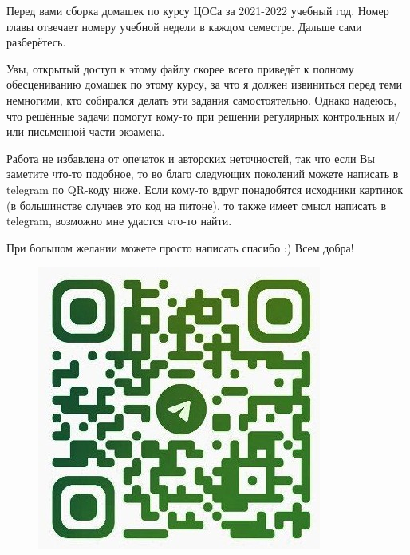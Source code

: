 Перед вами сборка домашек по курсу ЦОСа за 2021-2022 учебный год. Номер главы отвечает номеру учебной недели в каждом семестре. Дальше сами разберётесь.


Увы, открытый доступ к этому файлу скорее всего приведёт к полному обесцениванию домашек по этому курсу, за что я должен извиниться перед теми немногими, кто собирался делать эти задания самостоятельно. Однако надеюсь, что решённые задачи помогут кому-то при решении регулярных контрольных и/или письменной части экзамена.


Работа не избавлена от опечаток и авторских неточностей, так что если Вы заметите что-то подобное, то во благо следующих поколений можете написать в telegram по QR-коду ниже. Если кому-то вдруг понадобятся исходники картинок (в большинстве случаев это код на питоне), то также имеет смысл написать в telegram, возможно мне удастся что-то найти. 


При большом желании можете просто написать спасибо :) Всем добра!


\begin{figure}[!h]
	\centering
	\includegraphics[width=0.4\columnwidth]{pics/telegram_qr.jpg}
	\label{fig:qr}
\end{figure}
